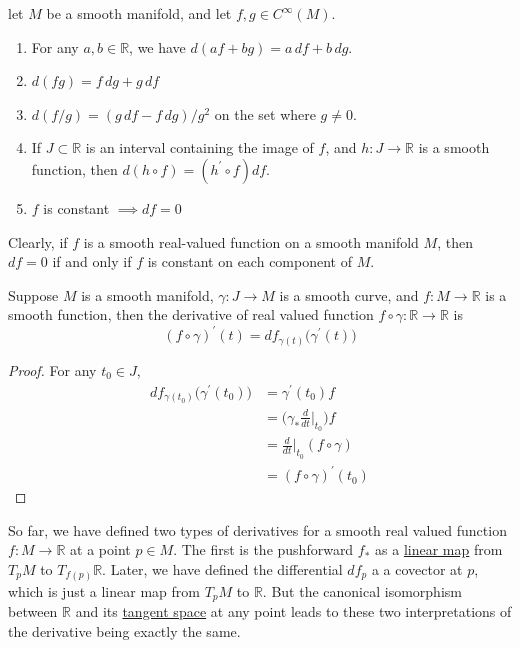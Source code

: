 \documentclass{article}
\newcounter{theorem}[section]
\begin{document}
    \begin{theorem}
      \label{thm:properties-of-the-differential}
    let $M$ be a smooth manifold, and let $f, g \in C^\infty (M)$. 
    \begin{enumerate}
        \item For any $a, b \in \mathbb{R}$, we have $d(a f + b g) = a\,df + b\,dg$. 
        \item $d(fg) = f\,dg + g\,df$
        \item $d(f/g) = (g\,df - f\,dg)/g^2$ on the set where $g \neq 0$. 
        \item If $J \subset \mathbb{R}$ is an interval containing the image of $f$, and $h: J \to \mathbb{R}$ is a smooth function, then $d(h \circ f) = (h^\prime \circ f) df$. 
        \item $f$ is constant $\implies df = 0$
    \end{enumerate}
    \end{theorem}
    Clearly, if $f$ is a smooth real-valued function on a smooth manifold $M$, then $df = 0$ if and only if $f$ is constant on each component of $M$. 

    \begin{theorem}
      \label{thm:derivative-of-a-function-along-a-curve}
    Suppose $M$ is a smooth manifold, $\gamma: J \to M$ is a smooth curve, and $f: M \to \mathbb{R}$ is a smooth function, then the derivative of real valued function $f \circ \gamma: \mathbb{R} \to \mathbb{R}$ is 
    \begin{equation}
      (f \circ \gamma)^\prime (t) = df_{\gamma(t)} \big( \gamma^\prime(t) \big)
    \end{equation}
    \end{theorem}
    \begin{proof}
    For any $t_0 \in J$,
    \begin{align*}
        df_{\gamma(t_0)} \big( \gamma^\prime (t_0)\big) & = \gamma^\prime (t_0) f \\
        & = \bigg( \gamma_* \frac{d}{dt} \bigg|_{t_0} \bigg) f \\
        & = \frac{d}{dt} \bigg|_{t_0} (f \circ \gamma) \\
        & = (f \circ \gamma)^\prime (t_0) 
    \end{align*}
    \end{proof}

    So far, we have defined two types of derivatives for a smooth real valued function $f: M \to \mathbb{R}$ at a point $p \in M$. The first is the pushforward $f_*$ as a \hyperref[lin-def:linear_map]{linear map} from $T_p M$ to $T_{f(p)} \mathbb{R}$. Later, we have defined the differential $df_p$ a a covector at $p$, which is just a linear map from $T_p M$ to $\mathbb{R}$. But the canonical isomorphism between $\mathbb{R}$ and its \hyperref[mv-def:tangent-space]{tangent space} at any point leads to these two interpretations of the derivative being exactly the same. 
\end{document}
